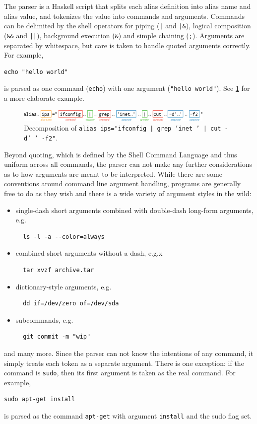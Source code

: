 The parser is a Haskell script that splits each alias definition into alias name and alias value, and tokenizes the value into commands and arguments.
Commands can be delimited by the shell operators for piping (\verb!|! and \verb!|&!), logical composition (\verb|&&| and \verb!||!), background execution (\verb|&|) and simple chaining (\verb|;|).
Arguments are separated by whitespace, but care is taken to handle quoted arguments correctly. 
For example, 
\begin{verbatim}
echo "hello world"
\end{verbatim}
is parsed as one command (\texttt{echo}) with one argument (\texttt{"hello world"}).
See \cref{fig:parser} for a more elaborate example.

\begin{figure}
    \centering
    \includegraphics[width=0.85\textwidth]{parser_breakdown.pdf}
    \caption{Decomposition of \texttt{alias ips="ifconfig | grep 'inet ' | cut -d' ' -f2"}.}
    \label{fig:parser}
\end{figure}

Beyond quoting, which is defined by the Shell Command Language and thus uniform across all commands, the parser can not make any further considerations as to how arguments are meant to be interpreted.
While there are some conventions around command line argument handling, programs are generally free to do as they wish and there is a wide variety of argument styles in the wild:
\begin{itemize}
    \item single-dash short arguments combined with double-dash long-form arguments, e.g.
        \begin{verbatim}  ls -l -a --color=always\end{verbatim}
    \item combined short arguments without a dash, e.g.x 
        \begin{verbatim}  tar xvzf archive.tar\end{verbatim}
    \item dictionary-style arguments, e.g.
        \begin{verbatim}  dd if=/dev/zero of=/dev/sda\end{verbatim}
    \item subcommands, e.g.
        \begin{verbatim}  git commit -m "wip"\end{verbatim}
\end{itemize}
and many more.
Since the parser can not know the intentions of any command, it simply treats each token as a separate argument.
There is one exception: if the command is \texttt{sudo}, then its first argument is taken as the real command. 
For example,
\begin{verbatim}
sudo apt-get install
\end{verbatim} 
is parsed as the command \texttt{apt-get} with argument \texttt{install} and the sudo flag set.

